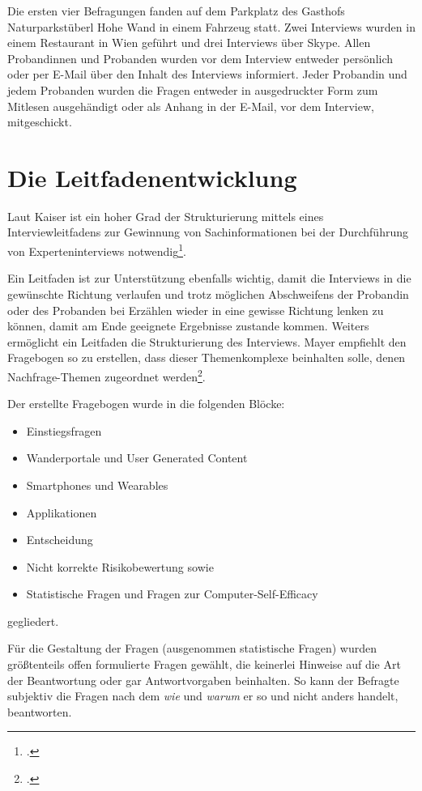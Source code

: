 Die ersten vier Befragungen fanden auf dem Parkplatz des Gasthofs Naturparkstüberl Hohe Wand in einem Fahrzeug statt. 
Zwei Interviews wurden in einem Restaurant in Wien geführt und drei Interviews über Skype. Allen Probandinnen und Probanden wurden vor dem Interview entweder persönlich oder per E-Mail über den Inhalt des Interviews informiert. Jeder Probandin und jedem Probanden wurden die Fragen entweder in ausgedruckter Form zum Mitlesen ausgehändigt oder als Anhang in der E-Mail, vor dem Interview, mitgeschickt.

\section{Die Leitfadenentwicklung}

Laut Kaiser ist ein hoher Grad der Strukturierung mittels eines Interviewleitfadens zur Gewinnung von Sachinformationen bei der Durchführung von Experteninterviews notwendig\footcite[S. 3]{kaiser}.

Ein Leitfaden ist zur Unterstützung ebenfalls wichtig, damit die Interviews in die gewünschte Richtung verlaufen und trotz möglichen Abschweifens der Probandin oder des Probanden bei Erzählen wieder in eine gewisse Richtung lenken zu können, damit am Ende geeignete Ergebnisse zustande kommen. Weiters ermöglicht ein Leitfaden die Strukturierung des Interviews. Mayer empfiehlt den Fragebogen so zu erstellen, dass dieser Themenkomplexe beinhalten solle, denen Nachfrage-Themen zugeordnet werden\footcite[S. 45]{mayer}. 

Der erstellte Fragebogen wurde in die folgenden Blöcke:
\begin{itemize}
	\item Einstiegsfragen
	\item Wanderportale und User Generated Content
	\item Smartphones und Wearables
	\item Applikationen
	\item Entscheidung
	\item Nicht korrekte Risikobewertung sowie
	\item Statistische Fragen und Fragen zur Computer-Self-Efficacy	
\end{itemize}
gegliedert.

Für die Gestaltung der Fragen (ausgenommen statistische Fragen) wurden größtenteils offen formulierte Fragen gewählt, die keinerlei Hinweise auf die Art der Beantwortung oder gar Antwortvorgaben beinhalten. So kann der Befragte subjektiv die Fragen nach dem \textit{wie} und \textit{warum} er so und nicht anders handelt, beantworten. 


